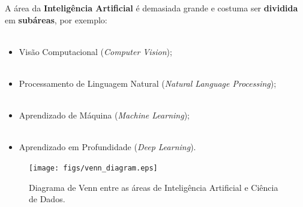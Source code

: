 \begin{frame}
	A área da \textbf{Inteligência Artificial} é demasiada grande e costuma ser \textbf{dividida} em \textbf{subáreas}, por exemplo:
	\\~\\
	\begin{itemize}
		\justifying
		\item Visão Computacional (\emph{Computer Vision});
		\\~\\
		\item Processamento de Linguagem Natural (\emph{Natural Language Processing});
		\\~\\
		\item Aprendizado de Máquina (\emph{Machine Learning});
		\\~\\
		\item Aprendizado em Profundidade (\emph{Deep Learning}).	
	\end{itemize}
\end{frame}

\begin{frame}
	\begin{figure}[!ht]
		\centering
		\texttt{[image: figs/venn\_diagram.eps]}	
		\label{f.venn_diagram}
		\caption{Diagrama de Venn entre as áreas de Inteligência Artificial e Ciência de Dados.}
	\end{figure}
\end{frame}